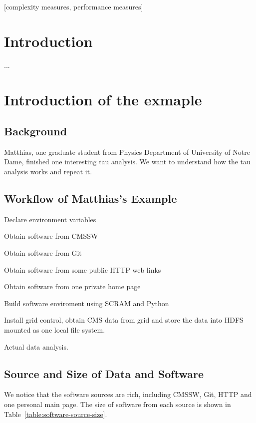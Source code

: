 \documentclass{acm_proc_article-sp}
\begin{document}
[complexity measures, performance measures]




\section{Introduction}
...
\section{Introduction of the exmaple}
\subsection{Background}
Matthias, one graduate student from Physics Department of University of Notre Dame, finished one interesting tau analysis. We want to understand how the tau analysis works and repeat it. 

\subsection{Workflow of Matthias's Example}
Declare environment variables

Obtain software from CMSSW

Obtain software from Git

Obtain software from some public HTTP web links

Obtain software from one private home page

Build software enviroment using SCRAM and Python

Install grid control, obtain CMS data from grid and store the data into HDFS mounted as one local file system.

Actual data analysis.

\subsection{Source and Size of Data and Software}
We notice that the software sources are rich, including CMSSW, Git, HTTP and one personal main page. The size of software from each source is shown in Table~\ref{table:software-source-size}.
\end{document}
